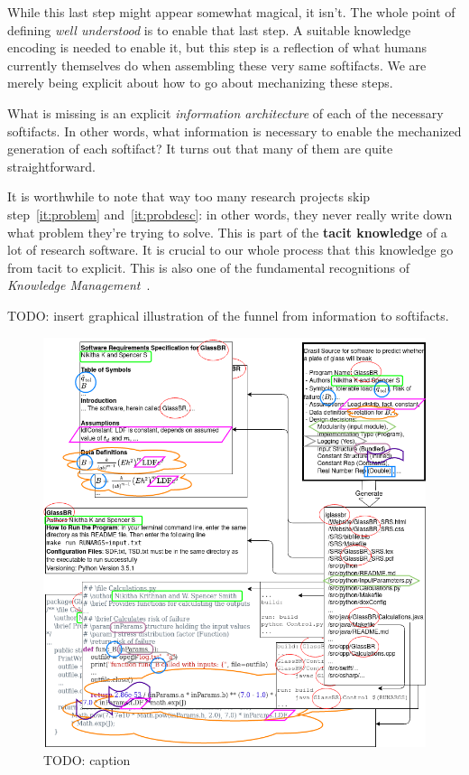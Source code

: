 \documentclass[sigconf,review]{acmart}
\begin{document}
While this last step might appear somewhat magical, it isn't. The whole
point of defining \emph{well understood} is to enable that last step. A
suitable knowledge encoding is needed to enable it, but this step is a
reflection of what humans currently themselves do when assembling these very
same softifacts. We are merely being explicit about how to go about
mechanizing these steps.

What is missing is an explicit \emph{information architecture} of each of
the necessary softifacts. In other words, what information is necessary to
enable the mechanized generation of each softifact? It turns out that many
of them are quite straightforward.

It is worthwhile to note that way too many research projects skip
step~\ref{it:problem} and~\ref{it:probdesc}: in other words, they never really
write down what problem they're trying to solve. This is part of the
\textbf{tacit knowledge} of a lot of research software.  It is crucial to our
whole process that this knowledge go from tacit to explicit. This is also one
of the fundamental recognitions of \emph{Knowledge
Management}~\cite{KM-textbook}.

TODO: insert graphical illustration of the funnel from information to
softifacts.

\begin{figure}[h]
  \centering
  \includegraphics[width=\linewidth]{assets/DrasilSupportsChange-right-portrait-overlapped-ungrouped-v1.drawio.png}
  \caption{TODO: caption}
\end{figure}
\end{document}
